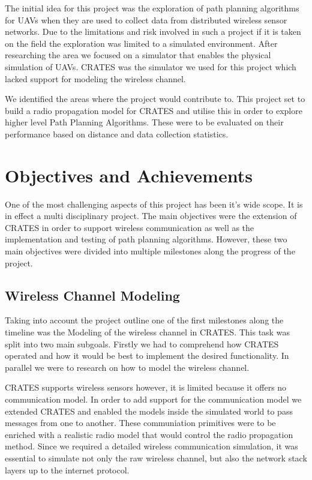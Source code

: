 The initial idea for this project was the exploration of path planning
algorithms for UAVs when they are used to collect data from distributed wireless
sensor networks. Due to the limitations and risk involved in such a project if it
is taken on the field the exploration was limited to a simulated environment.
After researching the area we focused on a simulator that enables the physical
simulation of UAVs. CRATES was the simulator we used for this project which
lacked support for modeling the wireless channel.

We identified the areas where the project would contribute to. This project set
to build a radio propagation model for CRATES and utilise this in order to
explore higher level Path Planning Algorithms. These were to be evaluated on
their performance based on distance and data collection statistics.


\section{Objectives and Achievements}
One of the most challenging aspects of this project has been it's wide scope. It
is in effect a multi disciplinary project. The main objectives were the
extension of CRATES in order to support wireless communication as well as
the implementation and testing of path planning algorithms. However, these two
main objectives were divided into multiple milestones along the progress of the
project.

\subsection{Wireless Channel Modeling}
Taking into account the project outline one of the first milestones along the
timeline was the Modeling of the wireless channel in CRATES. This task was split
into two main subgoals. Firstly we had to comprehend how CRATES operated and how
it would be best to implement the desired functionality. In parallel we were to
research on how to model the wireless channel.

CRATES supports wireless sensors however, it is limited because it offers no
communication model. In order to add support for the communication model we
extended CRATES and enabled the models inside the simulated world to pass
messages from one to another. These communiation primitives were to be enriched
with a realistic radio model that would control the radio propagation method.
Since we required a detailed wireless communication simulation, it was
essential to simulate not only the raw wireless channel, but also the network
stack layers up to the internet protocol.

